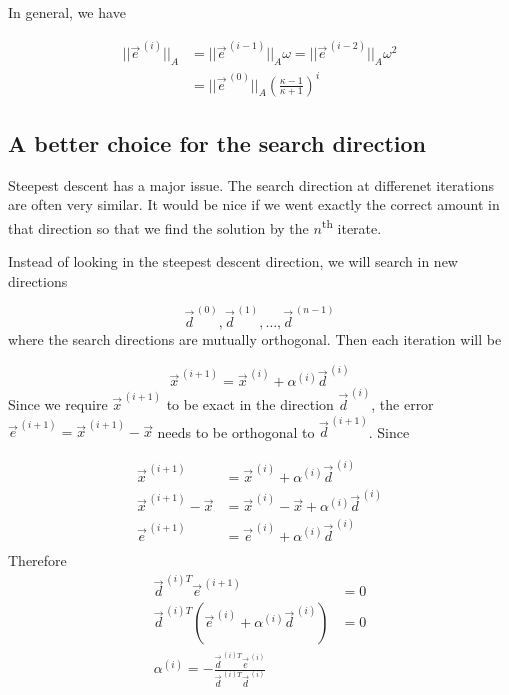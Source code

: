 
In general, we have

\begin{align*}
    || \vec{e}^{\,(i)} ||_A &= || \vec{e}^{\,(i-1)} ||_A\omega = || \vec{e}^{\,(i-2)} ||_A\omega^2\\
    &= || \vec{e}^{\,(0)} ||_A \left(\frac{\kappa-1}{\kappa+1}\right)^i
\end{align*}

\subsection{A better choice for the search direction}

Steepest descent has a major issue. The search direction at differenet iterations are often very similar. It would be nice if we went exactly the correct amount in that direction so that we find the solution by the $n$\textsuperscript{th} iterate.


\begin{center}
    
\end{center}


Instead of looking in the steepest descent direction, we will search in new directions

\begin{equation*}
    \vec{d}^{\,(0)}, \vec{d}^{\,(1)}, \ldots, \vec{d}^{\,(n-1)}
\end{equation*}
where the search directions are mutually orthogonal. Then each iteration will be

\begin{equation*}
    \vec{x}^{\,(i+1)} = \vec{x}^{\,(i)}+ \alpha^{(i)}\vec{d}^{\,(i)}
\end{equation*}
Since we require $\vec{x}^{\,(i+1)}$ to be exact in the direction $\vec{d}^{\,(i)}$, the error $\vec{e}^{\,(i+1)} = \vec{x}^{\,(i+1)}-\vec{x}$ needs to be orthogonal to $\vec{d}^{\,(i+1)}$. Since

\begin{align*}
    \vec{x}^{\,(i+1)} &= \vec{x}^{\,(i)}+ \alpha^{(i)}\vec{d}^{\,(i)} \\
    \vec{x}^{\,(i+1)} -\vec{x} &= \vec{x}^{\,(i)}- \vec{x}+ \alpha^{(i)}\vec{d}^{\,(i)}  \\
    \vec{e}^{\,(i+1)} &= \vec{e}^{\,(i)}+ \alpha^{(i)}\vec{d}^{\,(i)} \\
\end{align*}
Therefore
\begin{align*}
    \vec{d}^{\,(i)T}\vec{e}^{\,(i+1)} &= 0 \\
    \vec{d}^{\,(i)T}(\vec{e}^{\,(i)}+ \alpha^{(i)}\vec{d}^{\,(i)}) &= 0 \\
    \alpha^{(i)} = - \frac{\vec{d}^{\,(i)T}\vec{e}^{\,(i)}}{\vec{d}^{\,(i)T}\vec{d}^{\,(i)}}
\end{align*}

